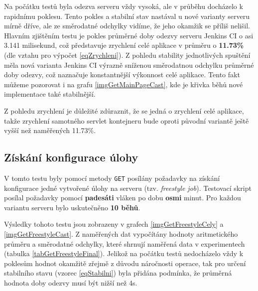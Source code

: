             \medskip
            Na počátku testů byla odezva serveru vždy vysoká, ale v průběhu docházelo k rapidnímu poklesu.
            Tento pokles a stabilní stav nastával u nové varianty serveru mírně dříve, ale ze
            směrodatné odchylky vidíme, že jeho okamžik se příliš nelišil. Hlavním
            zjištěním testu je pokles průměrné doby odezvy serveru Jenkins CI o asi 3.141 milisekund,
            což představuje zrychlení celé aplikace v průměru o \textbf{11.73\%} (dle vztahu pro výpočet \ref{eqZrychleni}).
            Z pohledu stability jednotlivých spuštění měla nová varianta Jenkins CI výrazně sníženou
            směrodatnou odchylku průměrné doby odezvy, což naznačuje konstantnější výkonnost celé aplikace.
            Tento fakt můžeme pozorovat i na grafu \ref{imgGetMainPageCast}, kde je křivka běhů nové implementace
            také stabilnější.

            Z pohledu zrychlení je důležité zdůraznit, že se jedná o zrychlení celé aplikace, takže
            zrychlení samotného servlet kontejneru bude oproti původní variantě ještě vyšší než naměřených 11.73\%.
            




        \subsection{Získání konfigurace úlohy}
            V tomto testu byly pomocí metody \texttt{GET} posílány požadavky na získání
            konfigurace jedné vytvořené úlohy na serveru (tzv. \emph{freestyle job}). 
            Testovací skript posílal požadavky pomocí \textbf{padesáti} vláken po dobu \textbf{osmi} minut.
            Pro každou variantu serveru bylo uskutečněno \textbf{10 běhů}. 

            Výsledky tohoto testu jsou zobrazeny v grafech \ref{imgGetFreestyleCely} a \ref{imgGetFreestyleCast}.
            Z naměřených dat vypočítány hodnoty aritmetického průměru a směrodatné odchylky,
            které shrnují naměřená data v experimentech (tabulka \ref{tabGetFreestyleFinal}).
            Jelikož na
            počátku testů nedocházelo vždy k poklesům hodnot okamžitě zřejmě z důvodu
            náročnosti operace, tak pro určení stabilního stavu (vzorec \ref{eqStabilni}) byla přidána
            podmínka, že průměrná hodnota doby odezvy musí být nižší než 4s.

